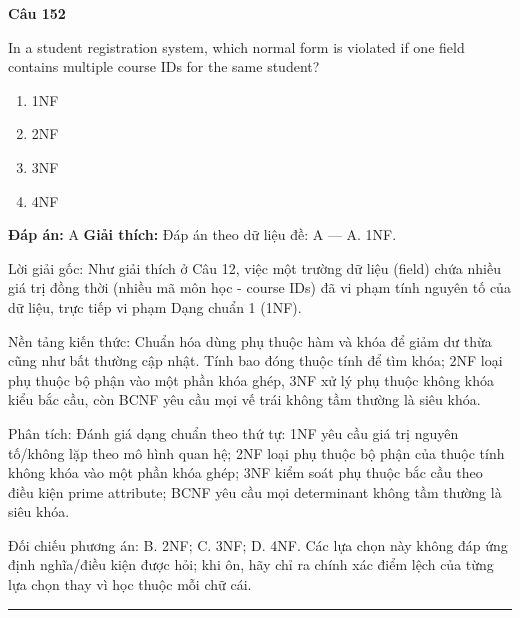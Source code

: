 \documentclass[11pt,a4paper]{article}
\newenvironment{question}[1]{%
  \par\vspace{1em}\noindent\textbf{\large Câu #1}\par\vspace{0.4em}
}{%
  \par\vspace{1em}\hrule\vspace{0.6em}
}
\newenvironment{choices}{%
  \begin{enumerate}[label=\textbf{\Alph*.},leftmargin=2.2em,itemsep=2pt,topsep=3pt]
}{%
  \end{enumerate}
}
\newcommand{\choice}{\item}
\begin{document}
\begin{question}{152}
In a student registration system, which normal form is violated if one field contains multiple course IDs for the same student?
\begin{choices}
\choice 1NF
\choice 2NF
\choice 3NF
\choice 4NF
\end{choices}
\textbf{Đáp án:} A
\textbf{Giải thích:} Đáp án theo dữ liệu đề: A — A. 1NF.

Lời giải gốc: Như giải thích ở Câu 12, việc một trường dữ liệu (field) chứa nhiều giá trị đồng thời (nhiều mã môn học - course IDs) đã vi phạm tính nguyên tố của dữ liệu, trực tiếp vi phạm Dạng chuẩn 1 (1NF).

Nền tảng kiến thức: Chuẩn hóa dùng phụ thuộc hàm và khóa để giảm dư thừa cũng như bất thường cập nhật. Tính bao đóng thuộc tính để tìm khóa; 2NF loại phụ thuộc bộ phận vào một phần khóa ghép, 3NF xử lý phụ thuộc không khóa kiểu bắc cầu, còn BCNF yêu cầu mọi vế trái không tầm thường là siêu khóa.

Phân tích: Đánh giá dạng chuẩn theo thứ tự: 1NF yêu cầu giá trị nguyên tố/không lặp theo mô hình quan hệ; 2NF loại phụ thuộc bộ phận của thuộc tính không khóa vào một phần khóa ghép; 3NF kiểm soát phụ thuộc bắc cầu theo điều kiện prime attribute; BCNF yêu cầu mọi determinant không tầm thường là siêu khóa.

Đối chiếu phương án: B. 2NF; C. 3NF; D. 4NF. Các lựa chọn này không đáp ứng định nghĩa/điều kiện được hỏi; khi ôn, hãy chỉ ra chính xác điểm lệch của từng lựa chọn thay vì học thuộc mỗi chữ cái.
\end{question}
\end{document}
